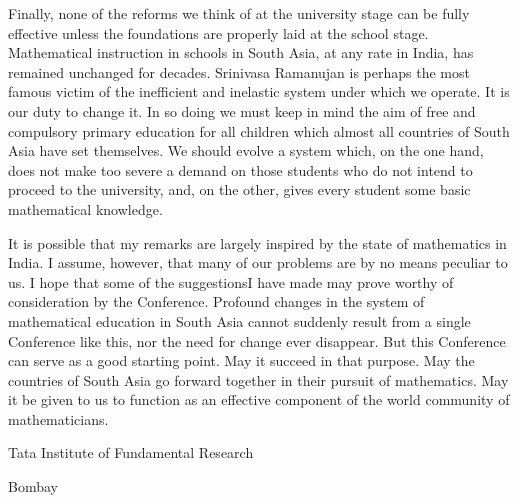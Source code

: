 Finally, none of the reforms we think of at the university stage can be fully effective unless the foundations are properly laid at the school stage. Mathematical instruction in schools in South Asia, at any rate in India, has remained unchanged for decades. Srinivasa Ramanujan is perhaps the most famous victim of the inefficient and inelastic system under which we operate. It is our duty to change it. In so doing we must keep in mind the aim of free and compulsory primary education for all children which almost all countries of South Asia have set themselves. We should evolve a system which, on the one hand, does not make too severe a demand on those students who do not intend to proceed to the university, and, on the other, gives every student some basic mathematical knowledge.

It is possible that my remarks are largely inspired by the state of mathematics in India. I assume, however, that many of our problems are by no means peculiar to us. I hope that some of the suggestions\pageoriginale I have made may prove worthy of consideration by the Conference. Profound changes in the system of mathematical education in South Asia cannot suddenly result from a single Conference like this, nor the need for change ever disappear. But this Conference can serve as a good starting point. May it succeed in that purpose. May the countries of South Asia go forward together in their pursuit of mathematics. May it be given to us to function as an effective component of the world community of mathematicians.

\bigskip
\medskip

{\fontsize{9pt}{11pt}\selectfont
Tata Institute of Fundamental Research

Bombay
}\relax

